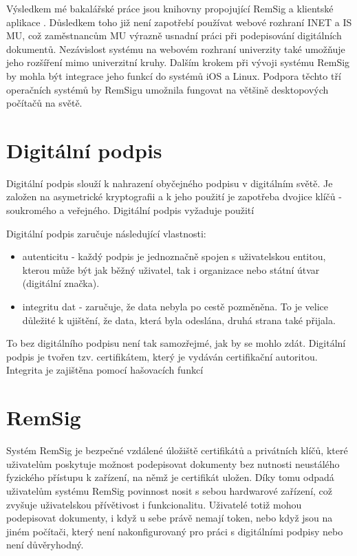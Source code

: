 \documentclass[]{fithesis3}
\begin{document}
Výsledkem mé bakalářské práce jsou knihovny propojující RemSig a klientské aplikace . Důsledkem toho již není zapotřebí používat webové rozhraní INET a IS MU, což zaměstnancům MU výrazně usnadní práci při podepisování digitálních dokumentů. Nezávislost systému na webovém rozhraní univerzity také umožňuje jeho rozšíření mimo univerzitní kruhy. Dalším krokem při vývoji systému RemSig by mohla být integrace jeho funkcí do systémů iOS a Linux. Podpora těchto tří operačních systémů by RemSigu umožnila fungovat na většině desktopových počítačů na světě.


\chapter{Digitální podpis}

Digitální podpis slouží k nahrazení obyčejného podpisu v digitálním světě. Je založen na asymetrické kryptografii a k jeho použití je zapotřeba dvojice klíčů - soukromého a veřejného. Digitální podpis vyžaduje použití 

Digitální podpis zaručuje následující vlastnosti:
\begin{itemize}
\item autenticitu - každý podpis je jednoznačně spojen s uživatelskou entitou, kterou může být jak běžný uživatel, tak i organizace nebo státní útvar (digitální značka).
\item integritu dat - zaručuje, že data nebyla po cestě pozměněna. To je velice důležité k ujištění, že data, která byla odeslána, druhá strana také přijala.
\end{itemize}
 To bez digitálního podpisu není tak samozřejmé, jak by se mohlo zdát. Digitální podpis je tvořen tzv. certifikátem, který je vydáván certifikační autoritou. Integrita je zajištěna pomocí hašovacích funkcí

\chapter{RemSig}

Systém RemSig je bezpečné vzdálené úložiště certifikátů a privátních klíčů, které uživatelům poskytuje možnost podepisovat dokumenty bez nutnosti neustálého fyzického přístupu k zařízení, na němž je certifikát uložen. Díky tomu odpadá uživatelům systému RemSig povinnost nosit s sebou hardwarové zařízení, což zvyšuje uživatelskou přívětivost i funkcionalitu. Uživatelé totiž mohou podepisovat dokumenty, i když u sebe právě nemají token, nebo když jsou na jiném počítači, který není nakonfigurovaný pro práci s digitálními podpisy nebo není důvěryhodný.
\end{document}
